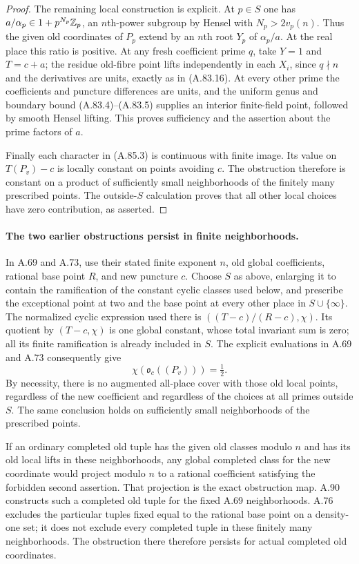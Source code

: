 \begin{proof}
The remaining local construction is explicit.
At $p\in S$ one has
$a/\alpha_p\in1+p^{N_p}\mathbb Z_p$, an $n$th-power subgroup
by Hensel with $N_p>2v_p(n)$.
Thus the given old coordinates of $P_p$ extend by an
$n$th root $Y_p$ of $\alpha_p/a$.
At the real place this ratio is positive.
At any fresh coefficient prime $q$, take $Y=1$ and
$T=c+a$; the residue old-fibre point lifts independently
in each $X_i$, since $q\nmid n$ and the derivatives are
units, exactly as in (A.83.16).
At every other prime the coefficients and puncture
differences are units, and the uniform genus and boundary
bound (A.83.4)--(A.83.5) supplies an interior finite-field
point, followed by smooth Hensel lifting.
This proves sufficiency and the assertion about the
prime factors of $a$.

Finally each character in (A.85.3) is continuous with
finite image.  Its value on $T(P_v)-c$ is locally
constant on points avoiding $c$.
The obstruction therefore is constant on a product
of sufficiently small neighborhoods of the finitely
many prescribed points.
The outside-$S$ calculation proves that all other local
choices have zero contribution, as asserted.
\end{proof}

\paragraph{The two earlier obstructions persist in finite neighborhoods.}
In A.69 and A.73, use their stated finite exponent $n$,
old global coefficients, rational base point $R$, and new
puncture $c$.
Choose $S$ as above, enlarging it to contain the ramification
of the constant cyclic classes used below, and prescribe the exceptional point
at two and the base point at every other place in
$S\cup\{\infty\}$.
The normalized cyclic expression used there is
$((T-c)/(R-c),\chi)$.
Its quotient by $(T-c,\chi)$ is one global constant,
whose total invariant sum is zero; all its finite
ramification is already included in $S$.
The explicit evaluations in A.69 and A.73 consequently
give
\[
                         \chi(\mathfrak o_c((P_v)))=\tfrac12.
 \tag{A.85.13}
\]
By necessity, there is no augmented all-place cover
with those old local points, regardless of the new
coefficient and regardless of the choices at all
primes outside $S$.
The same conclusion holds on sufficiently small
neighborhoods of the prescribed points.

If an ordinary completed old tuple has the given old
classes modulo $n$ and has its old local lifts in these
neighborhoods, any global completed class for the new
coordinate would project modulo $n$ to a rational
coefficient satisfying the forbidden second assertion.
That projection is the exact obstruction map.
A.90 constructs such a completed old tuple for the
fixed A.69 neighborhoods.
A.76 excludes the particular tuples fixed equal to
the rational base point on a density-one set; it does
not exclude every completed tuple in these finitely
many neighborhoods.
The obstruction there therefore persists for actual
completed old coordinates.

